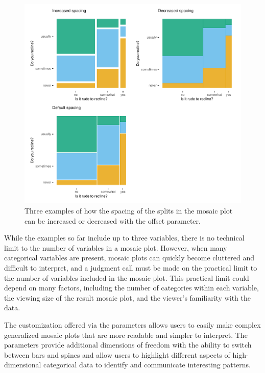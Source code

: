 \begin{figure}

{\centering \includegraphics[width=1\linewidth]{RJ-2023-013_files/figure-latex/space-1} 

}

\caption{Three examples of how the spacing of the splits in the mosaic plot can be increased or decreased with the offset parameter.}\label{fig:space}
\end{figure}

While the examples so far include up to three variables, there is no technical limit to the number of variables in a mosaic plot. However, when many categorical variables are present, mosaic plots can quickly become cluttered and difficult to interpret, and a judgment call must be made on the practical limit to the number of variables included in the mosaic plot. This practical limit could depend on many factors, including the number of categories within each variable, the viewing size of the result mosaic plot, and the viewer's familiarity with the data.

The customization offered via the  parameters allows users to easily make complex generalized mosaic plots that are more readable and simpler to interpret. The parameters provide additional dimensions of freedom with the ability to switch between bars and spines and allow users to highlight different aspects of high-dimensional categorical data to identify and communicate interesting patterns.

